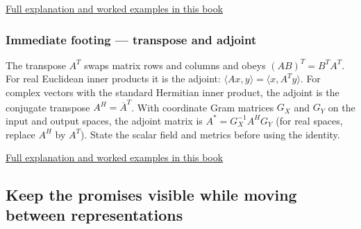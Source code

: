 \hyperref[01-foundations-i-ch018-a-normal-is-a-measuring-rule-before-it-is-an-arrow]{Full explanation and worked examples in this book}

\subsubsection{Immediate footing --- transpose and adjoint}\label{01-foundations-i-ch018-immediate-footing-transpose-and-adjoint}

The transpose \(A^T\) swaps matrix rows and columns and obeys \((AB)^T=B^TA^T\). For real Euclidean inner products it is the adjoint: \(\langle Ax,y\rangle=\langle x,A^Ty\rangle\). For complex vectors with the standard Hermitian inner product, the adjoint is the conjugate transpose \(A^H=\overline{A}^T\). With coordinate Gram matrices \(G_X\) and \(G_Y\) on the input and output spaces, the adjoint matrix is \(A^*=G_X^{-1}A^HG_Y\) (for real spaces, replace \(A^H\) by \(A^T\)). State the scalar field and metrics before using the identity.

\hyperref[01-foundations-i-ch018-transpose-lets-us-compare-measurements-and-structure]{Full explanation and worked examples in this book}

\subsection{Keep the promises visible while moving between representations}\label{01-foundations-i-ch018-keep-the-promises-visible-while-moving-between-representations}

